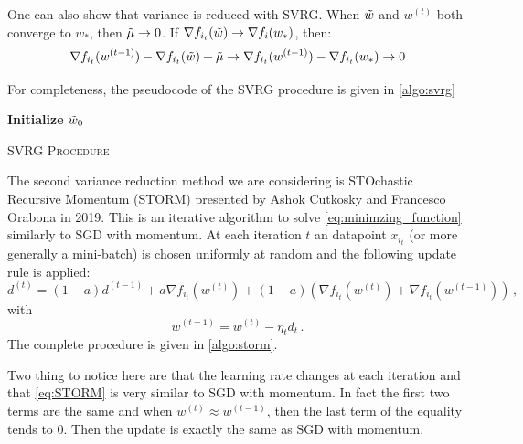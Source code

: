 \documentclass[a4paper,11pt,oneside]{report}
\begin{document}
One can also show that variance is reduced with SVRG. When $\Tilde{w}$ and $w^{(t)}$ both converge to $w_{\ast}$, then $\Tilde{\mu} \rightarrow 0$. If $\nabla f_{i_t}(\Tilde{w}) \rightarrow \nabla f_i(w_{\ast})$, then:
\begin{equation}
    \nabla f_{i_t}(w^{(t-1)}) - \nabla f_{i_t}(\Tilde{w}) + \Tilde{\mu} \rightarrow \nabla f_{i_t}(w^{(t-1)}) - \nabla f_{i_t}(w_{\ast}) \rightarrow 0
\end{equation}
        
For completeness, the pseudocode of the SVRG procedure is given in \autoref{algo:svrg}

\begin{algorithm}[H]
    \DontPrintSemicolon
    \SetAlgoNoLine
    
    \textbf{Initialize} $\Tilde{w}_0$\;
    \caption{{\textsc{SVRG Procedure}}}
    \label{algo:svrg}
\end{algorithm}

The second variance reduction method we are considering is STOchastic Recursive Momentum (STORM) presented by Ashok Cutkosky and Francesco Orabona in 2019. This is an iterative algorithm to solve \autoref{eq:minimzing_function} similarly to SGD with momentum. At each iteration $t$ an datapoint $x_{i_t}$ (or more generally a mini-batch) is chosen uniformly at random and the following update rule is applied:
\begin{equation}\label{eq:STORM}
    d^{(t)} = (1-a)d^{(t-1)} + a\nabla f_{i_t}(w^{(t)}) + (1-a)(\nabla f_{i_t}(w^{(t)}) +  \nabla f_{i_t}(w^{(t-1)}))\,,
\end{equation}
with
\begin{equation}
    w^{(t+1)} = w^{(t)} - \eta_t d_t\,.
\end{equation}
The complete procedure is given in \autoref{algo:storm}.

Two thing to notice here are that the learning rate changes at each iteration and that \autoref{eq:STORM} is very similar to SGD with momentum. In fact the first two terms are the same and when $w^{(t)} \approx w^{(t-1)}$, then the last term of the equality tends to 0. Then the update is exactly the same as SGD with momentum.
\end{document}
